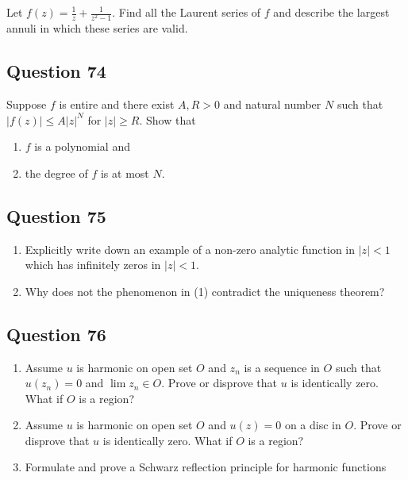 \documentclass[12pt]{article}
\begin{document}
Let \(\displaystyle f(z) = \frac{1}{z} + \frac{1}{z^2 -1}\). Find all
the Laurent series of \(f\) and describe the largest annuli in which
these series are valid.

\hypertarget{question-74-2}{%
\subsection{Question 74}\label{question-74-2}}

Suppose \(f\) is entire and there exist \(A, R >0\) and natural number
\(N\) such that \(|f(z)| \leq A |z|^N\) for \(|z| \geq R\). Show that

\begin{enumerate}
\def\labelenumi{(\roman{enumi})}
\item
  \(f\) is a polynomial and
\item
  the degree of \(f\) is at most \(N\).
\end{enumerate}

\hypertarget{question-75-2}{%
\subsection{Question 75}\label{question-75-2}}

\begin{enumerate}
\def\labelenumi{(\arabic{enumi})}
\item
  Explicitly write down an example of a non-zero analytic function in
  \(|z|<1\) which has infinitely zeros in \(|z|<1\).
\item
  Why does not the phenomenon in (1) contradict the uniqueness theorem?
\end{enumerate}

\hypertarget{question-76-2}{%
\subsection{Question 76}\label{question-76-2}}

\begin{enumerate}
\def\labelenumi{(\arabic{enumi})}
\item
  Assume \(u\) is harmonic on open set \(O\) and \(z_n\) is a sequence
  in \(O\) such that \(u(z_n) = 0\) and \(\lim z_n \in O\). Prove or
  disprove that \(u\) is identically zero. What if \(O\) is a region?
\item
  Assume \(u\) is harmonic on open set \(O\) and \(u(z) = 0\) on a disc
  in \(O\). Prove or disprove that \(u\) is identically zero. What if
  \(O\) is a region?
\item
  Formulate and prove a Schwarz reflection principle for harmonic
  functions
\end{enumerate}
\end{document}
